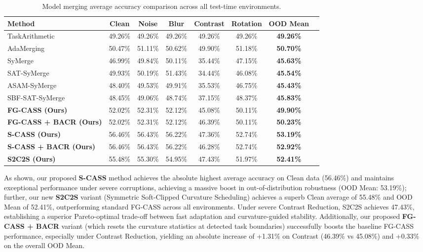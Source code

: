 \documentclass{article}
\theoremstyle{plain}
\theoremstyle{definition}
\theoremstyle{remark}
\begin{document}
\begin{table}[t]
\caption{Model merging average accuracy comparison across all test-time environments.}
\label{tab:overall}
\vskip 0.15in
\begin{center}
\begin{small}
\begin{sc}
\begin{tabular}{lccccccc}
\toprule
Method & Clean & Noise & Blur & Contrast & Rotation & OOD Mean \\
\midrule
TaskArithmetic & 49.26\% & 49.26\% & 49.26\% & 49.26\% & 49.26\% & \textbf{49.26\%} \\
AdaMerging & 50.47\% & 51.11\% & 50.62\% & 49.90\% & 51.18\% & \textbf{50.70\%} \\
SyMerge & 46.99\% & 49.84\% & 50.11\% & 35.44\% & 47.15\% & \textbf{45.63\%} \\
SAT-SyMerge & 49.93\% & 50.19\% & 51.43\% & 34.44\% & 46.08\% & \textbf{45.54\%} \\
ASAM-SyMerge & 48.40\% & 49.53\% & 49.91\% & 35.53\% & 46.75\% & \textbf{45.43\%} \\
SBF-SAT-SyMerge & 48.45\% & 49.06\% & 48.74\% & 37.15\% & 48.37\% & \textbf{45.83\%} \\
\textbf{FG-CASS (Ours)} & 52.02\% & 52.31\% & 52.12\% & 45.08\% & 50.11\% & \textbf{49.90\%} \\
\textbf{FG-CASS + BACR (Ours)} & 52.02\% & 52.31\% & 52.12\% & 46.39\% & 50.11\% & \textbf{50.23\%} \\
\textbf{S-CASS (Ours)} & 56.46\% & 56.43\% & 56.22\% & 47.36\% & 52.74\% & \textbf{53.19\%} \\
\textbf{S-CASS + BACR (Ours)} & 56.46\% & 56.43\% & 56.22\% & 46.28\% & 52.74\% & \textbf{52.92\%} \\
\textbf{S2C2S (Ours)} & 55.48\% & 55.30\% & 54.95\% & 47.43\% & 51.97\% & \textbf{52.41\%} \\
\bottomrule
\end{tabular}
\end{sc}
\end{small}
\end{center}
\vskip -0.1in
\end{table}

As shown, our proposed \textbf{S-CASS} method achieves the absolute highest average accuracy on Clean data (56.46\%) and maintains exceptional performance under severe corruptions, achieving a massive boost in out-of-distribution robustness (OOD Mean: 53.19\%); further, our new \textbf{S2C2S} variant (Symmetric Soft-Clipped Curvature Scheduling) achieves a superb Clean average of 55.48\% and OOD Mean of 52.41\%, outperforming standard FG-CASS across all environments. Under severe Contrast Reduction, S2C2S achieves 47.43\%, establishing a superior Pareto-optimal trade-off between fast adaptation and curvature-guided stability. Additionally, our proposed \textbf{FG-CASS + BACR} variant (which resets the curvature statistics at detected task boundaries) successfully boosts the baseline FG-CASS performance, especially under Contrast Reduction, yielding an absolute increase of +1.31\% on Contrast (46.39\% vs 45.08\%) and +0.33\% on the overall OOD Mean.
\end{document}
